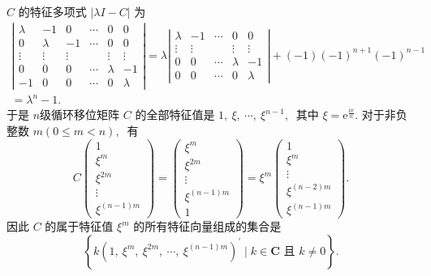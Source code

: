\begin{solution}
	$C $ 的特征多项式  $|\lambda I-C| $ 为
	$$\begin{array}{l}
		\left|\begin{array}{rcrrrr}
			\lambda & -1 & 0 & \cdots & 0 & 0 \\
			0 & \lambda & -1 & \cdots & 0 & 0 \\
			\vdots & \vdots & \vdots & & \vdots & \vdots \\
			0 & 0 & 0 & \cdots & \lambda & -1 \\
			-1 & 0 & 0 & \cdots & 0 & \lambda
		\end{array}\right|=\lambda\left|\begin{array}{rrrrr}
			\lambda & -1 & \cdots & 0 & 0 \\
			\vdots & \vdots & & \vdots & \vdots \\
			0 & 0 & \cdots & \lambda & -1 \\
			0 & 0 & \cdots & 0 & \lambda
		\end{array}\right|+(-1)(-1)^{n+1}(-1)^{n-1} \\
		=\lambda^{n}-1 .
	\end{array}$$
	于是  $n  $级循环移位矩阵  $C $ 的全部特征值是 $ 1,\  \xi,\  \cdots,\  \xi^{n-1} ,\ $ 其中 $ \xi=\mathrm{e}^{\frac{\mathrm{i} \pi}{n}}. $
	对于非负整数 $ m(0 \leqslant m<n) ,\ $ 有
	$$C\left(\begin{array}{c}
		1 \\
		\xi^{m} \\
		\xi^{2 m} \\
		\vdots \\
		\xi^{(n-1) m}
	\end{array}\right)=\left(\begin{array}{c}
		\xi^{m} \\
		\xi^{2 m} \\
		\vdots \\
		\xi^{(n-1) m} \\
		1
	\end{array}\right)=\xi^{m}\left(\begin{array}{c}
		1 \\
		\xi^{m} \\
		\vdots \\
		\xi^{(n-2) m} \\
		\xi^{(n-1) m}
	\end{array}\right) .$$
	因此 $ C $ 的属于特征值 $ \xi^{m}$  的所有特征向量组成的集合是
	$$\left\{k\left(1,\  \xi^{m},\  \xi^{2 m},\  \cdots,\  \xi^{(n-1) m}\right)^{\prime} \mid k \in \mathbf{C} \text { 且 } k \neq 0\right\} .$$
\end{solution}
